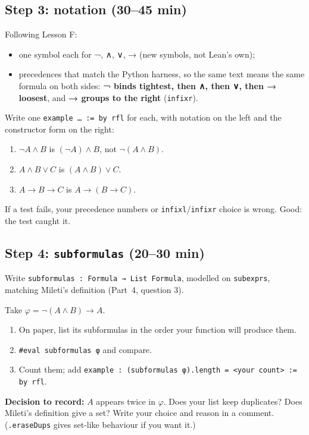 \documentclass[11pt,a4paper]{article}
\newcommand{\code}[1]{\texttt{#1}}
\begin{document}
\subsection{Step 3: notation (30--45 min)}
Following Lesson F:
\begin{itemize}
\item one symbol each for ¬, ∧, ∨, → (new symbols, not Lean's own);
\item precedences that match the Python harness, so the same text means the same formula on both sides:
\textbf{¬ binds tightest, then ∧, then ∨, then → loosest}, and \textbf{→ groups to the right} (\code{infixr}).
\end{itemize}
\begin{okbox}
Write one \code{example … := by rfl} for each, with notation on the left and the constructor form on the right:
\begin{enumerate}
\item $\neg A\wedge B$ is $(\neg A)\wedge B$, not $\neg(A\wedge B)$.
\item $A\wedge B\vee C$ is $(A\wedge B)\vee C$.
\item $A\to B\to C$ is $A\to(B\to C)$.
\end{enumerate}
If a test fails, your precedence numbers or \code{infixl}/\code{infixr} choice is wrong. Good: the test caught it.
\end{okbox}

\subsection{Step 4: \texttt{subformulas} (20--30 min)}
Write \code{subformulas : Formula → List Formula}, modelled on \code{subexprs}, matching Mileti's definition (Part~4, question 3).
\begin{okbox}
Take $\varphi = \neg(A\wedge B)\to A$.
\begin{enumerate}
\item On paper, list its subformulas in the order your function will produce them.
\item \code{\#eval subformulas φ} and compare.
\item Count them; add \code{example : (subformulas φ).length = <your count> := by rfl}.
\end{enumerate}
\end{okbox}
\textbf{Decision to record:} $A$ appears twice in $\varphi$. Does your list keep duplicates? Does Mileti's definition give a set? Write your choice and reason in a comment. (\code{.eraseDups} gives set-like behaviour if you want it.)
\end{document}
